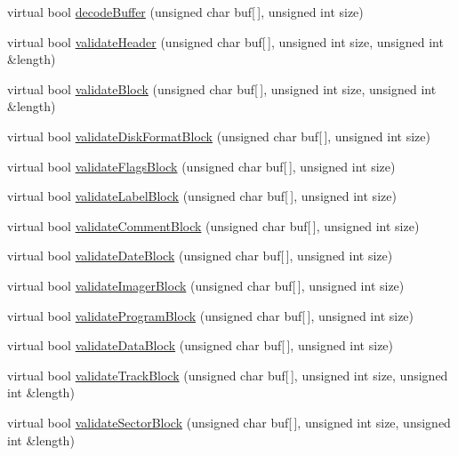 \begin{DoxyCompactItemize}
virtual bool \hyperlink{classH17Disk_ada058d8b970b4e72569e2fe000817f75}{decode\+Buffer} (unsigned char buf\mbox{[}$\,$\mbox{]}, unsigned int size)
\item 
virtual bool \hyperlink{classH17Disk_ad9402e7823ac0a2741dc316cae361ecd}{validate\+Header} (unsigned char buf\mbox{[}$\,$\mbox{]}, unsigned int size, unsigned int \&length)
\item 
virtual bool \hyperlink{classH17Disk_a29f4d35fba24f0d9cee37bcb02120a6c}{validate\+Block} (unsigned char buf\mbox{[}$\,$\mbox{]}, unsigned int size, unsigned int \&length)
\item 
virtual bool \hyperlink{classH17Disk_aaf268125dfe0bb84c288aff63f5e865d}{validate\+Disk\+Format\+Block} (unsigned char buf\mbox{[}$\,$\mbox{]}, unsigned int size)
\item 
virtual bool \hyperlink{classH17Disk_a676a126b40c2697cbdeb32648a69c15d}{validate\+Flags\+Block} (unsigned char buf\mbox{[}$\,$\mbox{]}, unsigned int size)
\item 
virtual bool \hyperlink{classH17Disk_a80cc18809c189366f4c8ecf494286129}{validate\+Label\+Block} (unsigned char buf\mbox{[}$\,$\mbox{]}, unsigned int size)
\item 
virtual bool \hyperlink{classH17Disk_a0f8be0fb5d8f55eb6843b6668f60facd}{validate\+Comment\+Block} (unsigned char buf\mbox{[}$\,$\mbox{]}, unsigned int size)
\item 
virtual bool \hyperlink{classH17Disk_a08c7c7f0cad0cc24224fc73227b9648e}{validate\+Date\+Block} (unsigned char buf\mbox{[}$\,$\mbox{]}, unsigned int size)
\item 
virtual bool \hyperlink{classH17Disk_a592a6390ad6a382cae246886993954a7}{validate\+Imager\+Block} (unsigned char buf\mbox{[}$\,$\mbox{]}, unsigned int size)
\item 
virtual bool \hyperlink{classH17Disk_adc15505d580fdb29e57c67293d5b3cda}{validate\+Program\+Block} (unsigned char buf\mbox{[}$\,$\mbox{]}, unsigned int size)
\item 
virtual bool \hyperlink{classH17Disk_a593434e6ce0538943cb044b7d0c9c273}{validate\+Data\+Block} (unsigned char buf\mbox{[}$\,$\mbox{]}, unsigned int size)
\item 
virtual bool \hyperlink{classH17Disk_a532c7c77626521afd001ed4a32610912}{validate\+Track\+Block} (unsigned char buf\mbox{[}$\,$\mbox{]}, unsigned int size, unsigned int \&length)
\item 
virtual bool \hyperlink{classH17Disk_a11e3a3c52730f4502a61f69035d7ab38}{validate\+Sector\+Block} (unsigned char buf\mbox{[}$\,$\mbox{]}, unsigned int size, unsigned int \&length)

\end{DoxyCompactItemize}
